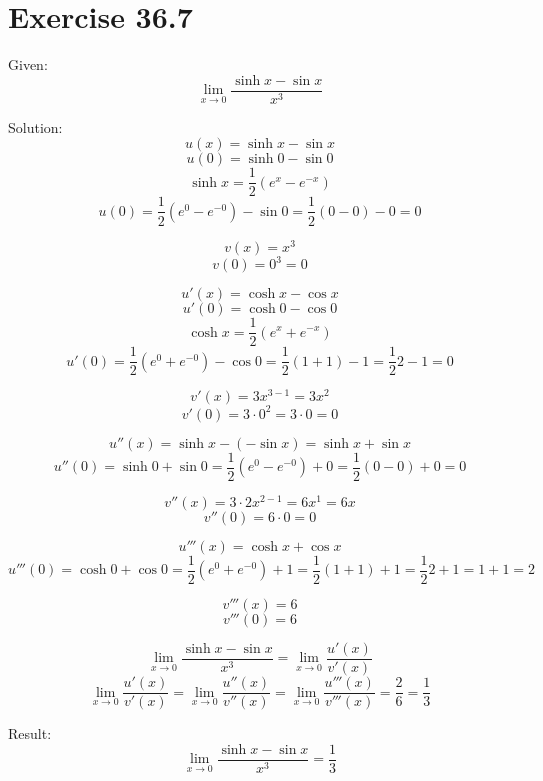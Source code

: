 \documentclass[a4paper, 10pt]{scrartcl}
\begin{document}
\section{Exercise 36.7}

Given:
\[\lim_{x\to 0}{\frac{\sinh{x} - \sin{x}}{x^{3}}}\]

Solution:
\[u(x) = \sinh{x} - \sin{x}\]
\[u(0) = \sinh{0} - \sin{0}\]
\[\sinh{x} = \frac{1}{2}(e^{x} - e^{-x})\]
\[u(0) = \frac{1}{2}(e^{0} - e^{-0}) - \sin{0} = \frac{1}{2}(0 - 0) - 0 = 0\]

\[v(x) = x^{3}\]
\[v(0) = 0^{3} = 0\]

\[u'(x) = \cosh{x} - \cos{x}\]
\[u'(0) = \cosh{0} - \cos{0}\]
\[\cosh{x} = \frac{1}{2}(e^{x} + e^{-x})\]
\[u'(0) = \frac{1}{2}(e^{0} + e^{-0}) - \cos{0} = \frac{1}{2}(1 + 1) - 1 = \frac{1}{2}2 - 1 = 0\]

\[v'(x) = 3x^{3 - 1} = 3x^{2}\]
\[v'(0) = 3\cdot 0^{2} = 3\cdot 0 = 0\]

\[u''(x) = \sinh{x} - (-\sin{x}) = \sinh{x} + \sin{x}\]
\[u''(0) = \sinh{0} + \sin{0} = \frac{1}{2}(e^{0} - e^{-0}) + 0 = \frac{1}{2}(0 - 0) + 0 = 0\]

\[v''(x) = 3\cdot 2x^{2 - 1} = 6x^{1} = 6x\]
\[v''(0) = 6\cdot 0 = 0\]

\[u'''(x) = \cosh{x} + \cos{x}\]
\[u'''(0) = \cosh{0} + \cos{0} = \frac{1}{2}(e^{0} + e^{-0}) + 1 = \frac{1}{2}(1 + 1) + 1 =
            \frac{1}{2}2 + 1 = 1 + 1 = 2\]

\[v'''(x) = 6\]
\[v'''(0) = 6\]

\[\lim_{x\to 0}{\frac{\sinh{x} - \sin{x}}{x^{3}}} = \lim_{x\to 0}{\frac{u'(x)}{v'(x)}}\]
\[\lim_{x\to 0}{\frac{u'(x)}{v'(x)}} = \lim_{x\to 0}{\frac{u''(x)}{v''(x)}} =
\lim_{x\to 0}{\frac{u'''(x)}{v'''(x)}} = \frac{2}{6} = \frac{1}{3}\]

Result:
\[\lim_{x\to 0}{\frac{\sinh{x} - \sin{x}}{x^{3}}} = \frac{1}{3}\]
\end{document}

